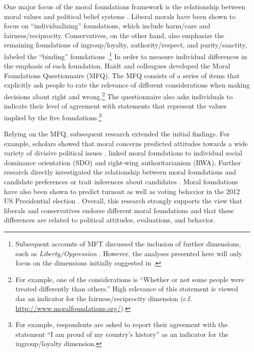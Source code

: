 \documentclass[12pt]{article}
\begin{document}
One major focus of the moral foundations framework is the relationship between moral values and political belief systems \citep[c.f.][]{haidt2012righteous}. Liberal morals have been shown to focus on ``individualizing'' foundations, which include harm/care and fairness/reciprocity. Conservatives, on the other hand, also emphasize the remaining foundations of ingroup/loyalty, authority/respect, and purity/sanctity, labeled the ``binding'' foundations \citep{haidt2007morality,graham2009liberals}.\footnote{Subsequent accounts of MFT discussed the inclusion of further dimensions, such as \textit{Liberty/Oppression} \citep[c.f.][]{graham2013moral,haidt2012righteous}. However, the analyses presented here will only focus on the dimensions initially suggested in \citet{haidt2008moral}.} In order to measure individual differences in the emphasis of each foundation, Haidt and colleagues developed the Moral Foundations Questionnaire (MFQ). The MFQ consists of a series of items that explicitly ask people to rate the relevance of different considerations when making decisions about right and wrong.\footnote{For example, one of the considerations is ``Whether or not some people were treated differently than others.'' High relevance of this statement is viewed das an indicator for the fairness/reciprocity dimension (c.f. \url{http://www.moralfoundations.org/}).} The questionnaire also asks individuals to indicate their level of agreement with statements that represent the values implied by the five foundations.\footnote{For example, respondents are asked to report their agreement with the statement ``I am proud of my country's history'' as an indicator for the ingroup/loyalty dimension.}

Relying on the MFQ, subsequent research extended the initial findings. For example, scholars showed that moral concerns predicted attitudes towards a wide variety of divisive political issues \citep[e.g.][]{koleva2012tracing,low2015moral}. \citet{federico2013mapping} linked moral foundations to individual social dominance orientation (SDO) and right-wing authoritarianism (RWA). Further research directly investigated the relationship between moral foundations and candidate preferences \citep{iyer2010beyond} or trait inferences about candidates \citep{clifford2014linking}. Moral foundations have also been shown to predict turnout \citep{johnson2014ideology} as well as voting behavior in the 2012 US Presidential election \citep{franks2015using}. Overall, this research strongly supports the view that liberals and conservatives endorse different moral foundations and that these differences are related to political attitudes, evaluations, and behavior.
\end{document}
